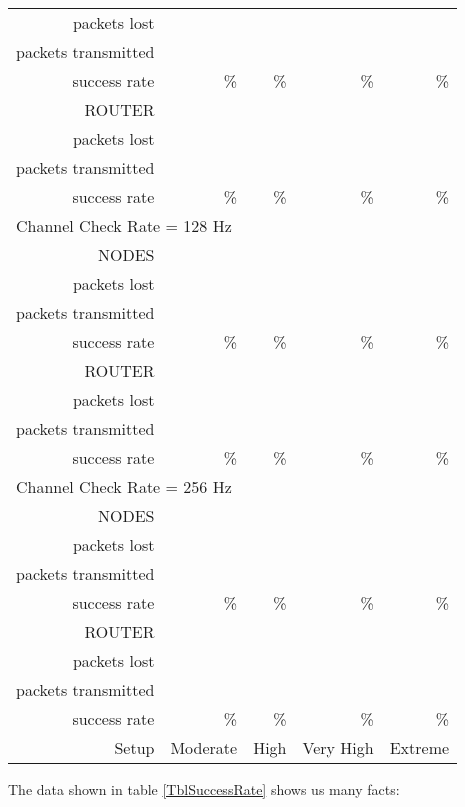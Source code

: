 \documentclass[a4paper,twoside]{article}
\begin{document}
\begin{table*}[htbp]
\begin{tabular}{|r|r|r|r|r|}
packets lost & & & & \\
packets transmitted & & & & \\
success rate & \% & \% & \% & \% \\
ROUTER & & & & \\
packets lost & & & & \\
packets transmitted & & & & \\
success rate & \% & \% & \% & \% \\
\hline
\multicolumn{5}{|l|}{Channel Check Rate = 128 Hz}\\
\hline
NODES & & & & \\
packets lost & & & & \\
packets transmitted & & & & \\
success rate & \% & \% & \% & \% \\
ROUTER & & & & \\
packets lost & & & & \\
packets transmitted & & & & \\
success rate & \% & \% & \% & \% \\
\hline
\multicolumn{5}{|l|}{Channel Check Rate = 256 Hz}\\
\hline
NODES & & & & \\
packets lost & & & & \\
packets transmitted & & & & \\
success rate & \% & \% & \% & \% \\
ROUTER & & & & \\
packets lost & & & & \\
packets transmitted & & & & \\
success rate & \% & \% & \% & \% \\
\hline
Setup & Moderate & High & Very High & Extreme \\
\hline
\end{tabular}
\caption{Rate of packets arrived to their destination,
         according to the ContikiMAC channel check rate.\\
         Results obtained with fixed packet number simulations.}
\label{TblSuccessRate}
\end{table*}

The data shown in table \ref{TblSuccessRate} shows us many facts:
\end{document}
